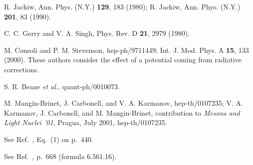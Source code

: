 \documentclass[a4paper,preprint,draft,showpacs,amsmath,amsfonts,amssymb,aps,prd]{revtex4}%
\begin{document}
\begin{thebibliography}{99}
R. Jackiw, Ann. Phys. (N.Y.) {\bf 129}, 183 (1980);
R. Jackiw, Ann. Phys. (N.Y.) {\bf 201}, 83 (1990).

C. C. Gerry and V. A. Singh,
Phys. Rev. D {\bf 21}, 2979 (1980).

M. Consoli and P. M. Stevenson,
hep-ph/9711449; Int. J. Mod. Phys. A {\bf 15}, 133 (2000).
These authors
consider the effect of a \coordHE{} potential coming 
from radiative corrections.

S. R. Beane {\em et al.\/},
quant-ph/0010073.

M. Mangin-Brinet, J. Carbonell, and V. A. Karmanov,
hep-th/0107235;
V. A. Karmanov, J. Carbonell, and  M. Mangin-Brinet, 
contribution to {\em Mesons and Light Nuclei '01\/},
Pragua, July 2001,
hep-th/0107235.

See Ref.~\cite{wat:44},
Eq.~(1) on 
p.\ 440.

See Ref.~\cite{gra:00}, 
p.\ 668  (formula 6.561.16).
 
\end{thebibliography}
\end{document}
